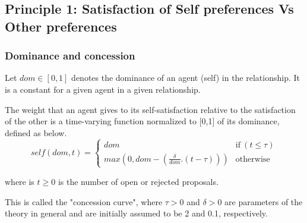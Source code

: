\documentclass{article}
\begin{document}
	\subsection{Principle 1: Satisfaction of Self preferences Vs Other preferences}
	
	\subsubsection{Dominance and concession}
	Let  $dom \in [0, 1] $ denotes the dominance of an agent (self) in the 	relationship.  It is a constant for a given agent in a given	relationship.
	
	The weight that an agent gives to its self-satisfaction relative to	the satisfaction of the other is a time-varying function normalized to 	[0,1] of its dominance, defined as below.
		$$self(dom, t) = \left\{\begin{array}{ll}
		dom & \mathrm{if\ } (t \leq \tau)\\
		max(0, dom - (\frac{\delta}{dom} . (t - \tau))) & \mathrm{otherwise}
		\end{array}\right.$$
		
	
	where is $t \geq 0$ is the number of open or rejected proposals.
	
	This is called the "concession curve", where $\tau > 0$ and $\delta > 0$
	are parameters of the theory in general and are initially assumed to
	be 2 and 0.1, respectively.
\end{document}
